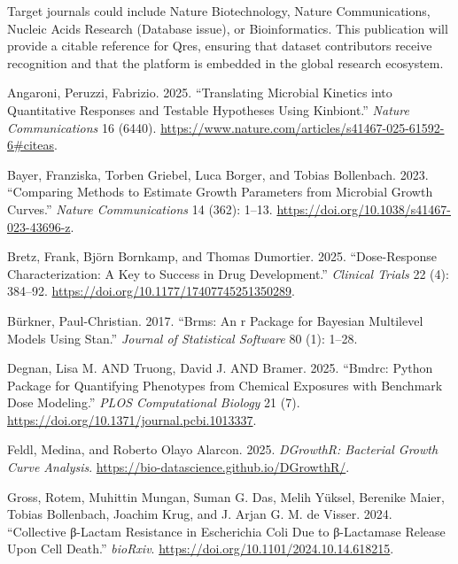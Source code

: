 \documentclass[
  letterpaper,
  DIV=11,
  numbers=noendperiod]{scrartcl}
\newlength{\cslhangindent}
\newenvironment{CSLReferences}[2] %
 {\begin{list}{}{%
  \setlength{\itemindent}{0pt}
  \setlength{\leftmargin}{0pt}
  \setlength{\parsep}{0pt}
  \ifodd #1
   \setlength{\leftmargin}{\cslhangindent}
   \setlength{\itemindent}{-1\cslhangindent}
  \fi
  \setlength{\itemsep}{#2\baselineskip}}}
 {\end{list}}
\begin{document}
Target journals could include Nature Biotechnology, Nature
Communications, Nucleic Acids Research (Database issue), or
Bioinformatics. This publication will provide a citable reference for
Qres, ensuring that dataset contributors receive recognition and that
the platform is embedded in the global research ecosystem.

\label{refs}
\begin{CSLReferences}{1}{0}
Angaroni, Peruzzi, Fabrizio. 2025. {``Translating Microbial Kinetics
into Quantitative Responses and Testable Hypotheses Using Kinbiont.''}
\emph{Nature Communications} 16 (6440).
\url{https://www.nature.com/articles/s41467-025-61592-6\#citeas}.

Bayer, Franziska, Torben Griebel, Luca Borger, and Tobias Bollenbach.
2023. {``Comparing Methods to Estimate Growth Parameters from Microbial
Growth Curves.''} \emph{Nature Communications} 14 (362): 1--13.
\url{https://doi.org/10.1038/s41467-023-43696-z}.

Bretz, Frank, Björn Bornkamp, and Thomas Dumortier. 2025.
{``Dose-Response Characterization: A Key to Success in Drug
Development.''} \emph{Clinical Trials} 22 (4): 384--92.
\url{https://doi.org/10.1177/17407745251350289}.

Bürkner, Paul-Christian. 2017. {``Brms: An r Package for Bayesian
Multilevel Models Using Stan.''} \emph{Journal of Statistical Software}
80 (1): 1--28.

Degnan, Lisa M. AND Truong, David J. AND Bramer. 2025. {``Bmdrc: Python
Package for Quantifying Phenotypes from Chemical Exposures with
Benchmark Dose Modeling.''} \emph{PLOS Computational Biology} 21 (7).
\url{https://doi.org/10.1371/journal.pcbi.1013337}.

Feldl, Medina, and Roberto Olayo Alarcon. 2025. \emph{DGrowthR:
Bacterial Growth Curve Analysis}.
\url{https://bio-datascience.github.io/DGrowthR/}.

Gross, Rotem, Muhittin Mungan, Suman G. Das, Melih Yüksel, Berenike
Maier, Tobias Bollenbach, Joachim Krug, and J. Arjan G. M. de Visser.
2024. {``Collective β-Lactam Resistance in Escherichia Coli Due to
β-Lactamase Release Upon Cell Death.''} \emph{bioRxiv}.
\url{https://doi.org/10.1101/2024.10.14.618215}.


\end{CSLReferences}
\end{document}
